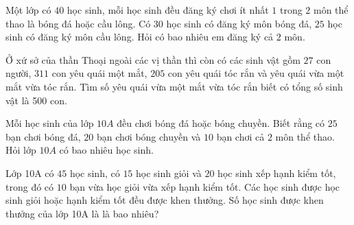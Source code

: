 \begin{vd}%
	Một lớp có $40$ học sinh, mỗi học sinh đều đăng ký chơi ít nhất $1$ trong $2$ môn thể thao là bóng đá hoặc cầu lông. Có $30$ học sinh có đăng ký môn bóng đá, $25$ học sinh có đăng ký môn cầu lông. Hỏi có bao nhiêu em đăng ký cả $2$ môn.
\end{vd}

\begin{vd}%
	Ở xứ sở của thần Thoại ngoài các vị thần thì còn có các sinh vật gồm $27$ con người, $311$ con yêu quái một mắt, $205$ con yêu quái tóc rắn và yêu quái vừa một mắt vừa tóc rắn. Tìm số yêu quái vừa một mắt vừa tóc rắn biết có tổng số sinh vật là 500 con.
\end{vd}

\begin{vd}%
	Mỗi học sinh của lớp $10A$ đều chơi bóng đá hoặc bóng chuyền. Biết rằng có $25$ bạn chơi bóng đá, $20$ bạn chơi bóng chuyền và $10$ bạn chơi cả $2$ môn thể thao. Hỏi lớp $10A$ có bao nhiêu học sinh.
\end{vd}

\begin{vd}%
	Lớp 10A có $45$ học sinh, có $15$ học sinh giỏi và $20$ học sinh xếp hạnh kiểm tốt, trong đó có $10$ bạn vừa học giỏi vừa xếp hạnh kiểm tốt. Các học sinh được học sinh giỏi hoặc hạnh kiểm tốt đều được khen thưởng. Số học sinh được khen thưởng của lớp 10A là là bao nhiêu?
\end{vd}

